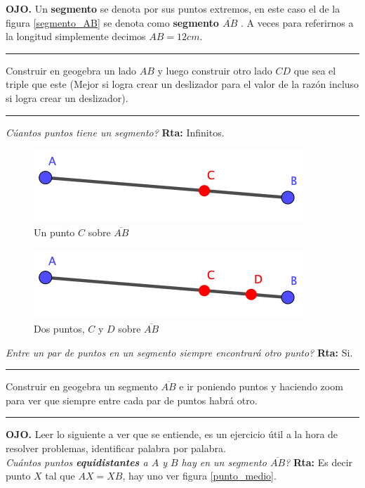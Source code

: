\textbf{OJO.} Un \textbf{segmento} se denota por sus puntos extremos, en este caso el de la figura \ref{segmento_AB} se denota como \textbf{segmento $\overline{AB}$ }. A veces para referirnos a la longitud simplemente decimos $AB=12cm$. 


\rule{\textwidth}{0.1mm}
\begin{act}
	Construir en geogebra un lado $AB$ y luego construir otro lado $CD$ que sea el triple que este (Mejor si logra crear un deslizador para el valor de la razón incluso si logra crear un deslizador).
\end{act}
\rule{\textwidth}{0.1mm}

\textit{Cúantos puntos tiene un segmento? } \textbf{Rta:} Infinitos.

\begin{figure}[H]
	\centering
	\includegraphics[width=0.4\linewidth]{Geometria/imgs/punto_C_sobre_AB}
	\caption{Un punto $C$ sobre $\overline{AB}$}
	\label{punto_C_sobre_AB}
\end{figure}

\begin{figure}[H]
	\centering
	\includegraphics[width=0.4\linewidth]{Geometria/imgs/puntos_C_D_sobre_AB}
	\caption{Dos puntos, $C$ y $D$ sobre $\overline{AB}$}
	\label{puntos_C_D_sobre_AB}
\end{figure}

\textit{Entre un par de puntos en un segmento siempre encontrará otro punto?} \textbf{Rta:} Si.

\rule{\textwidth}{0.1mm}
\begin{act}
	Construir en geogebra un segmento $\overline{AB}$ e ir poniendo puntos y haciendo zoom para ver que siempre entre cada par de puntos habrá otro.
\end{act}
\rule{\textwidth}{0.1mm}

\textbf{OJO.} Leer lo siguiente a ver que se entiende, es un ejercicio útil a la hora de resolver problemas, identificar palabra por palabra.\\
\textit{Cuántos puntos \textbf{equidistantes} a $A$ y $B$ hay en un segmento $\overline{AB}$?} \textbf{Rta:} Es decir punto $X$ tal que $AX=XB$, hay uno ver figura \ref{punto_medio}.
 
